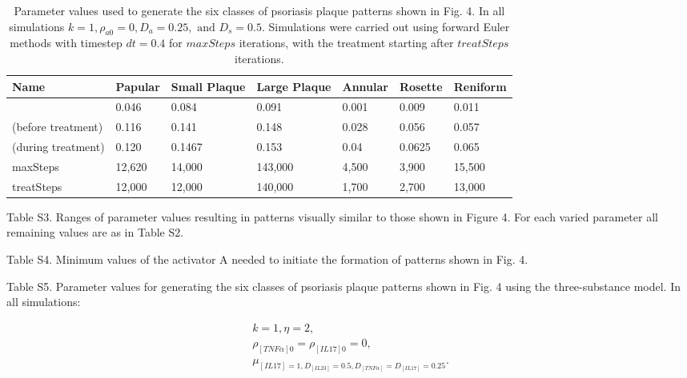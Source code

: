 \begin{table}[h]
	\centering
	\begin{tabular}{|l|l|l|l|l|l|l|}
	\hline
	\textbf{Name}      & \textbf{Papular} & \textbf{Small Plaque} & \textbf{Large Plaque} & \textbf{Annular} & \textbf{Rosette} & \textbf{Reniform} \\ \hline
                   & 0.046            & 0.084                 & 0.091                 & 0.001            & 0.009            & 0.011             \\ \hline
(before treatment) & 0.116            & 0.141                 & 0.148                 & 0.028            & 0.056            & 0.057             \\ \hline
(during treatment) & 0.120            & 0.1467                & 0.153                 & 0.04             & 0.0625           & 0.065             \\ \hline
maxSteps           & 12,620           & 14,000                & 143,000               & 4,500            & 3,900            & 15,500            \\ \hline
treatSteps         & 12,000           & 12,000                & 140,000               & 1,700            & 2,700            & 13,000            \\ \hline
	\end{tabular}
	\caption{Parameter values used to generate the six classes of psoriasis plaque patterns shown in Fig. 4. In all simulations $k=1, \rho_{a0}=0, D_a=0.25, \text{ and } D_s=0.5$.  Simulations were carried out using forward Euler methods with timestep $dt=0.4$ for $maxSteps$ iterations, with the treatment starting after $treatSteps$ iterations.}
	\label{tab:S2}
\end{table}

Table S3. Ranges of parameter values resulting in patterns visually similar to those shown in Figure 4. For each varied parameter all remaining values are as in Table S2.

Table S4. Minimum values of the activator A needed to initiate the formation of patterns shown in Fig. 4.

Table S5. Parameter values for generating the six classes of psoriasis plaque patterns shown in Fig. 4 using the three-substance model. In all simulations:

\begin{equation}
\begin{aligned}
k = 1, \eta = 2, \\
\rho_{[TNF\alpha]0} = \rho_{[IL17]0} = 0, \\
\mu_{[IL17] = 1, D_{[IL23]} = 0.5, D_{[TNF\alpha]} = D_{[IL17]} = 0.25}. 
\end{aligned}
\end{equation}

